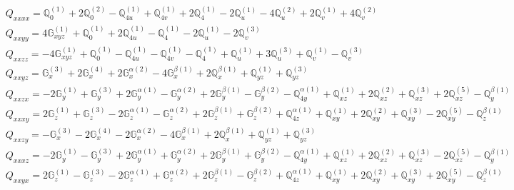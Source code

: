 \documentclass[fleqn,8pt,landscape]{jsarticle}
\begin{document}
\begin{align*}
& Q_{xxxx} = \mathbb{Q}_{0}^{(1)} + 2 \mathbb{Q}_{0}^{(2)} - \mathbb{Q}_{4u}^{(1)} + \mathbb{Q}_{4v}^{(1)} + 2 \mathbb{Q}_{4}^{(1)} - 2 \mathbb{Q}_{u}^{(1)} - 4 \mathbb{Q}_{u}^{(2)} + 2 \mathbb{Q}_{v}^{(1)} + 4 \mathbb{Q}_{v}^{(2)} \\
& Q_{xxyy} = 4 \mathbb{G}_{xyz}^{(1)} + \mathbb{Q}_{0}^{(1)} + 2 \mathbb{Q}_{4u}^{(1)} - \mathbb{Q}_{4}^{(1)} - 2 \mathbb{Q}_{u}^{(1)} - 2 \mathbb{Q}_{v}^{(3)} \\
& Q_{xxzz} = - 4 \mathbb{G}_{xyz}^{(1)} + \mathbb{Q}_{0}^{(1)} - \mathbb{Q}_{4u}^{(1)} - \mathbb{Q}_{4v}^{(1)} - \mathbb{Q}_{4}^{(1)} + \mathbb{Q}_{u}^{(1)} + 3 \mathbb{Q}_{u}^{(3)} + \mathbb{Q}_{v}^{(1)} - \mathbb{Q}_{v}^{(3)} \\
& Q_{xxyz} = \mathbb{G}_{x}^{(3)} + 2 \mathbb{G}_{x}^{(4)} + 2 \mathbb{G}_{x}^{\alpha(2)} - 4 \mathbb{G}_{x}^{\beta(1)} + 2 \mathbb{Q}_{x}^{\beta(1)} + \mathbb{Q}_{yz}^{(1)} + \mathbb{Q}_{yz}^{(3)} \\
& Q_{xxzx} = - 2 \mathbb{G}_{y}^{(1)} + \mathbb{G}_{y}^{(3)} + 2 \mathbb{G}_{y}^{\alpha(1)} - \mathbb{G}_{y}^{\alpha(2)} + 2 \mathbb{G}_{y}^{\beta(1)} - \mathbb{G}_{y}^{\beta(2)} - \mathbb{Q}_{4y}^{\alpha(1)} + \mathbb{Q}_{xz}^{(1)} + 2 \mathbb{Q}_{xz}^{(2)} + \mathbb{Q}_{xz}^{(3)} + 2 \mathbb{Q}_{xz}^{(5)} - \mathbb{Q}_{y}^{\beta(1)} \\
& Q_{xxxy} = 2 \mathbb{G}_{z}^{(1)} + \mathbb{G}_{z}^{(3)} - 2 \mathbb{G}_{z}^{\alpha(1)} - \mathbb{G}_{z}^{\alpha(2)} + 2 \mathbb{G}_{z}^{\beta(1)} + \mathbb{G}_{z}^{\beta(2)} + \mathbb{Q}_{4z}^{\alpha(1)} + \mathbb{Q}_{xy}^{(1)} + 2 \mathbb{Q}_{xy}^{(2)} + \mathbb{Q}_{xy}^{(3)} - 2 \mathbb{Q}_{xy}^{(5)} - \mathbb{Q}_{z}^{\beta(1)} \\
& Q_{xxzy} = - \mathbb{G}_{x}^{(3)} - 2 \mathbb{G}_{x}^{(4)} - 2 \mathbb{G}_{x}^{\alpha(2)} - 4 \mathbb{G}_{x}^{\beta(1)} + 2 \mathbb{Q}_{x}^{\beta(1)} + \mathbb{Q}_{yz}^{(1)} + \mathbb{Q}_{yz}^{(3)} \\
& Q_{xxxz} = - 2 \mathbb{G}_{y}^{(1)} - \mathbb{G}_{y}^{(3)} + 2 \mathbb{G}_{y}^{\alpha(1)} + \mathbb{G}_{y}^{\alpha(2)} + 2 \mathbb{G}_{y}^{\beta(1)} + \mathbb{G}_{y}^{\beta(2)} - \mathbb{Q}_{4y}^{\alpha(1)} + \mathbb{Q}_{xz}^{(1)} + 2 \mathbb{Q}_{xz}^{(2)} + \mathbb{Q}_{xz}^{(3)} - 2 \mathbb{Q}_{xz}^{(5)} - \mathbb{Q}_{y}^{\beta(1)} \\
& Q_{xxyx} = 2 \mathbb{G}_{z}^{(1)} - \mathbb{G}_{z}^{(3)} - 2 \mathbb{G}_{z}^{\alpha(1)} + \mathbb{G}_{z}^{\alpha(2)} + 2 \mathbb{G}_{z}^{\beta(1)} - \mathbb{G}_{z}^{\beta(2)} + \mathbb{Q}_{4z}^{\alpha(1)} + \mathbb{Q}_{xy}^{(1)} + 2 \mathbb{Q}_{xy}^{(2)} + \mathbb{Q}_{xy}^{(3)} + 2 \mathbb{Q}_{xy}^{(5)} - \mathbb{Q}_{z}^{\beta(1)} \\

\end{align*}
\end{document}
